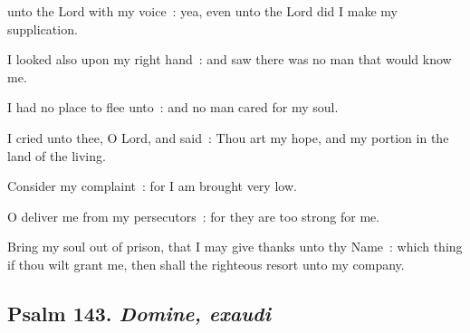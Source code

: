  unto the Lord with my voice~: yea, even unto the Lord did I make my supplication.\par
{}
I looked also upon my right hand~: and saw there was no man that would know me.\par
{}I had no place to flee unto~: and no man cared for my soul.\par
{}I cried unto thee, O Lord, and said~: Thou art my hope, and my portion in the land of the living.\par
{}Consider my complaint~: for I am brought very low.\par
{}O deliver me from my persecutors~: for they are too strong for me.\par
{}Bring my soul out of prison, that I may give thanks unto thy Name~: which thing if thou wilt grant me, then shall the righteous resort unto my company.\par


\subsection{Psalm 143. \textit{Domine, exaudi}}


